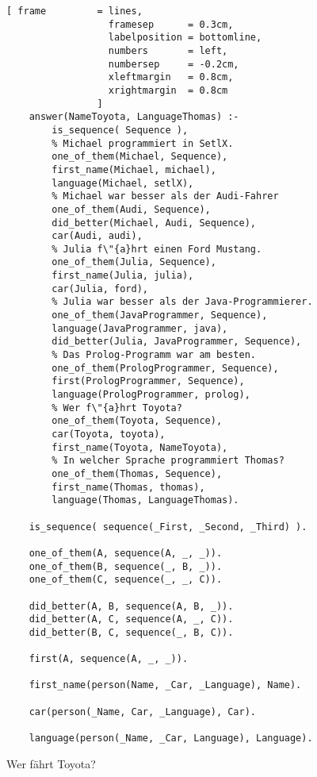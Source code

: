 \begin{figure}[!h]
  \centering
\begin{Verbatim}[ frame         = lines, 
                  framesep      = 0.3cm, 
                  labelposition = bottomline,
                  numbers       = left,
                  numbersep     = -0.2cm,
                  xleftmargin   = 0.8cm,
                  xrightmargin  = 0.8cm
                ]
    answer(NameToyota, LanguageThomas) :-
        is_sequence( Sequence ),
        % Michael programmiert in SetlX.
        one_of_them(Michael, Sequence),
        first_name(Michael, michael),  
        language(Michael, setlX),
        % Michael war besser als der Audi-Fahrer                     
        one_of_them(Audi, Sequence),
        did_better(Michael, Audi, Sequence),         
        car(Audi, audi),
        % Julia f\"{a}hrt einen Ford Mustang.
        one_of_them(Julia, Sequence),
        first_name(Julia, julia),
        car(Julia, ford), 
        % Julia war besser als der Java-Programmierer.
        one_of_them(JavaProgrammer, Sequence),
        language(JavaProgrammer, java),
        did_better(Julia, JavaProgrammer, Sequence), 
        % Das Prolog-Programm war am besten.
        one_of_them(PrologProgrammer, Sequence),
        first(PrologProgrammer, Sequence),           
        language(PrologProgrammer, prolog),
        % Wer f\"{a}hrt Toyota?
        one_of_them(Toyota, Sequence),
        car(Toyota, toyota),
        first_name(Toyota, NameToyota),              
        % In welcher Sprache programmiert Thomas?
        one_of_them(Thomas, Sequence),
        first_name(Thomas, thomas),
        language(Thomas, LanguageThomas).            
        
    is_sequence( sequence(_First, _Second, _Third) ).
    
    one_of_them(A, sequence(A, _, _)).
    one_of_them(B, sequence(_, B, _)).
    one_of_them(C, sequence(_, _, C)).
    
    did_better(A, B, sequence(A, B, _)).
    did_better(A, C, sequence(A, _, C)).
    did_better(B, C, sequence(_, B, C)).
    
    first(A, sequence(A, _, _)).
    
    first_name(person(Name, _Car, _Language), Name).
    
    car(person(_Name, Car, _Language), Car).
    
    language(person(_Name, _Car, Language), Language).
\end{Verbatim}
\vspace*{-0.3cm}
  \caption{Wer f\"{a}hrt Toyota?}
  \label{fig:toyota}
\end{figure}

